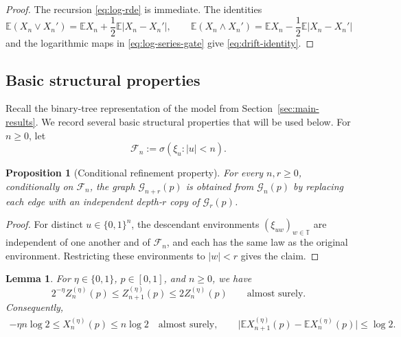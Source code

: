 \documentclass[12pt,preprint]{amsart}
\numberwithin{equation}{section}
\theoremstyle{plain}
\newtheorem{proposition}[theorem]{Proposition}
\newtheorem{lemma}[theorem]{Lemma}
\theoremstyle{definition}
\newcommand{\E}{\mathbb E}
\begin{document}
\begin{proof}
The recursion \eqref{eq:log-rde} is immediate.  The identities
\[
 \E(X_n\vee X_n')=\E X_n+\frac12\E|X_n-X_n'|,
 \qquad
 \E(X_n\wedge X_n')=\E X_n-\frac12\E|X_n-X_n'|
\]
and the logarithmic maps in \eqref{eq:log-series-gate} give
\eqref{eq:drift-identity}.
\end{proof}

\subsection{Basic structural properties}
\label{sec:canonical-refinement-coupling}

Recall the binary-tree representation of the model from
Section~\ref{sec:main-results}.  We record several basic structural properties
that will be used below.  For $n\ge0$, let
\[
 \mathcal F_n:=\sigma(\xi_u:|u|<n).
\]

\begin{proposition}[Conditional refinement property]
\label{prop:conditional-refinement}
For every $n,r\ge0$, conditionally on $\mathcal F_n$, the graph
$\mathcal G_{n+r}(p)$ is obtained from $\mathcal G_n(p)$ by replacing each
edge with an independent depth-$r$ copy of $\mathcal G_r(p)$.
\end{proposition}

\begin{proof}
For distinct $u\in\{0,1\}^n$, the descendant environments
$(\xi_{uw})_{w\in\mathbb T}$ are independent of one another and of
$\mathcal F_n$, and each has the same law as the original environment.
Restricting these environments to $|w|<r$ gives the claim.
\end{proof}

\begin{lemma}
\label{lem:deterministic-bound}
For $\eta\in\{0,1\}$, $p\in[0,1]$, and $n\ge0$, we have
\begin{equation}
 2^{-\eta}Z_n^{(\eta)}(p)
 \le Z_{n+1}^{(\eta)}(p)
 \le 2Z_n^{(\eta)}(p)
 \qquad\text{almost surely}.
 \label{eq:adjacent-Z}
\end{equation}
Consequently,
\begin{equation}
\begin{aligned}
 -\eta n\log2
 \le X_n^{(\eta)}(p)\le n\log2
 \quad\text{almost surely},\qquad
 \big|\E X_{n+1}^{(\eta)}(p)-\E X_n^{(\eta)}(p)\big|
 \le\log2.
\end{aligned}
 \label{eq:deterministic-bound}
\end{equation}
\end{lemma}
\end{document}
